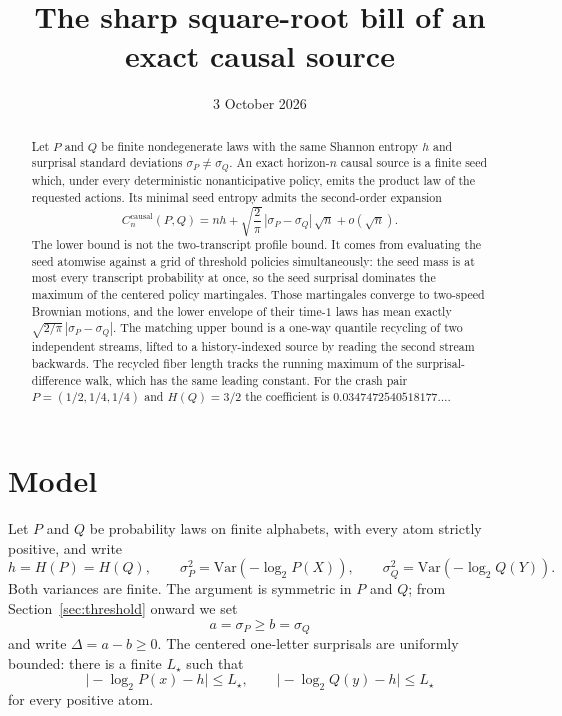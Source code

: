 \documentclass[11pt]{article}
\title{The sharp square-root bill of an exact causal source}
\author{}
\date{3 October 2026}
\theoremstyle{definition}
\newcommand{\causal}{\mathrm{causal}}
\begin{document}
\maketitle

\begin{abstract}
Let \(P\) and \(Q\) be finite nondegenerate laws with the same Shannon entropy \(h\) and surprisal standard deviations \(\sigma_P\neq\sigma_Q\).
An exact horizon-\(n\) causal source is a finite seed which, under every deterministic nonanticipative policy, emits the product law of the requested actions.
Its minimal seed entropy admits the second-order expansion
\[
  C_n^{\causal}(P,Q)
  =
  nh+\sqrt{\frac{2}{\pi}}\,|\sigma_P-\sigma_Q|\,\sqrt{n}+o(\sqrt{n}).
\]
The lower bound is not the two-transcript profile bound.
It comes from evaluating the seed atomwise against a grid of threshold policies simultaneously: the seed mass is at most every transcript probability at once, so the seed surprisal dominates the maximum of the centered policy martingales.
Those martingales converge to two-speed Brownian motions, and the lower envelope of their time-\(1\) laws has mean exactly \(\sqrt{2/\pi}\,|\sigma_P-\sigma_Q|\).
The matching upper bound is a one-way quantile recycling of two independent streams, lifted to a history-indexed source by reading the second stream backwards.
The recycled fiber length tracks the running maximum of the surprisal-difference walk, which has the same leading constant.
For the crash pair \(P=(1/2,1/4,1/4)\) and \(H(Q)=3/2\) the coefficient is \(0.0347472540518177\ldots\).
\end{abstract}

\section{Model}

Let \(P\) and \(Q\) be probability laws on finite alphabets, with every atom strictly positive, and write
\[
  h=H(P)=H(Q),\qquad
  \sigma_P^2=\mathrm{Var}(-\log_2 P(X)),\qquad
  \sigma_Q^2=\mathrm{Var}(-\log_2 Q(Y)).
\]
Both variances are finite.
The argument is symmetric in \(P\) and \(Q\); from Section~\ref{sec:threshold} onward we set
\[
  a=\sigma_P\ge b=\sigma_Q
\]
and write \(\Delta=a-b\ge 0\).
The centered one-letter surprisals are uniformly bounded: there is a finite \(L_\star\) such that
\[
  \bigl|-\log_2 P(x)-h\bigr|\le L_\star,\qquad
  \bigl|-\log_2 Q(y)-h\bigr|\le L_\star
\]
for every positive atom.
\end{document}
